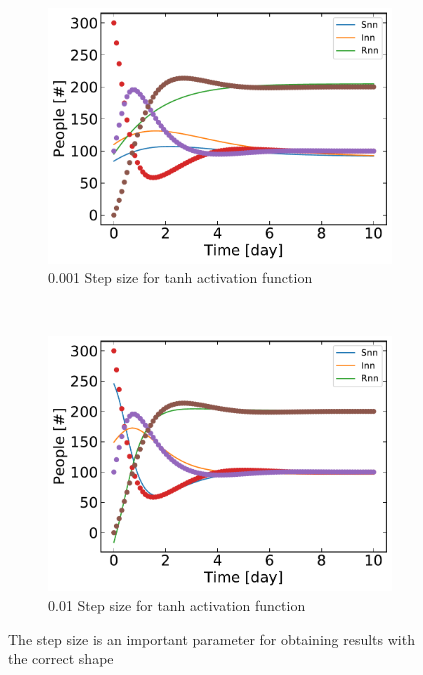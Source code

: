 	 \begin{figure}[H]
	     \centering
	     \begin{subfigure}{0.5\textwidth}
	         \centering
	         \includegraphics[width=\linewidth]{result/Resultater_supervised/tanh_1000_100_001.pdf}
	         \caption{0.001 Step size for tanh activation function}
	     \end{subfigure}%
	     ~ 
	     \begin{subfigure}{0.5\textwidth}
	         \centering
	         \includegraphics[width=\linewidth]{result/Resultater_supervised/tanh_1000_100_01.pdf}
	         \caption{0.01 Step size for tanh activation function}
	     \end{subfigure}
	     \caption{The step size is an important parameter for obtaining results with the correct shape}
	     \label{fig:step size}
	 \end{figure}
